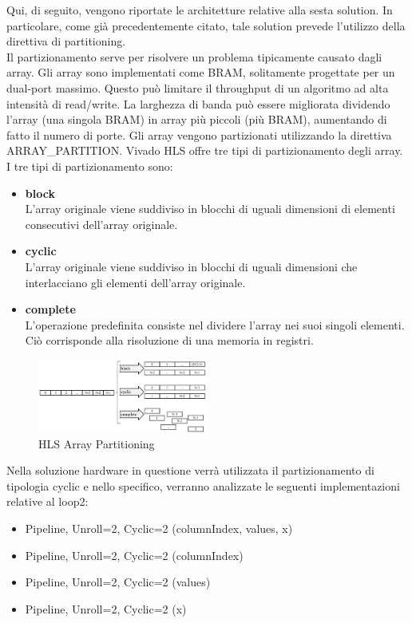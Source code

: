 Qui, di seguito, vengono riportate le architetture relative alla sesta solution. In particolare, come già precedentemente citato, tale solution prevede l'utilizzo della direttiva di partitioning. 
\\
Il partizionamento serve per risolvere un problema tipicamente causato dagli array. Gli array sono implementati come BRAM, solitamente progettate per un dual-port massimo. Questo può limitare il throughput di un algoritmo ad alta intensità di read/write. La larghezza di banda può essere migliorata dividendo l'array (una singola BRAM) in array più piccoli (più BRAM), aumentando di fatto il numero di porte. Gli array vengono partizionati utilizzando la direttiva ARRAY\_PARTITION. Vivado HLS offre tre tipi di partizionamento degli array. I tre tipi di partizionamento sono:
\begin{itemize}
	\item \textbf{block}\\L'array originale viene suddiviso in blocchi di uguali dimensioni di elementi consecutivi dell'array originale.
	\item \textbf{cyclic}\\L'array originale viene suddiviso in blocchi di uguali dimensioni che interlacciano gli elementi dell'array originale.
	\item \textbf{complete}\\L'operazione predefinita consiste nel dividere l'array nei suoi singoli elementi. Ciò corrisponde alla risoluzione di una memoria in registri.
\end{itemize}

\begin{figure}[H]
	\centering
	\includegraphics[width=0.5\textwidth]{solutions/s6/partitioning.png}
	\caption{HLS Array Partitioning}
\end{figure}

Nella soluzione hardware in questione verrà utilizzata il partizionamento di tipologia cyclic e nello specifico, verranno analizzate le seguenti implementazioni relative al loop2:
\begin{itemize}
	\item Pipeline, Unroll=2, Cyclic=2 (columnIndex, values, x)
	\item Pipeline, Unroll=2, Cyclic=2 (columnIndex)
	\item Pipeline, Unroll=2, Cyclic=2 (values)
	\item Pipeline, Unroll=2, Cyclic=2 (x)
\end{itemize}

